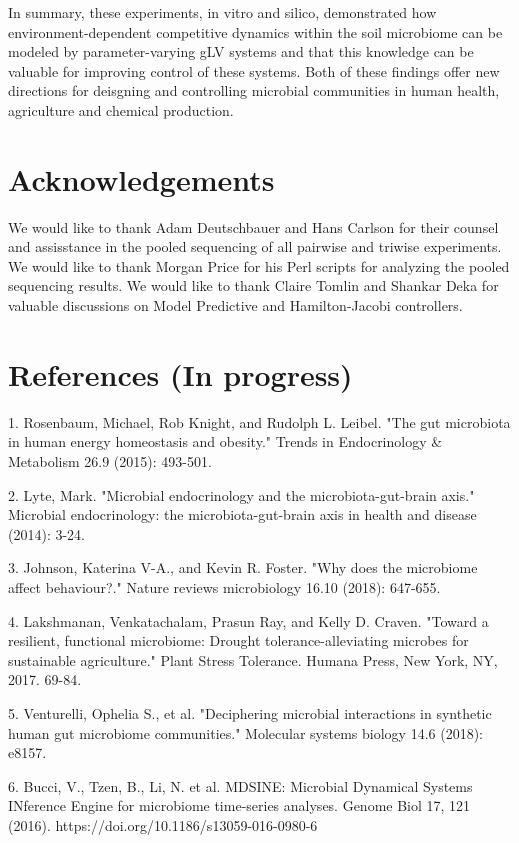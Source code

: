 \documentclass[twocolumn, 10pt]{report}
\begin{document}
{In summary, these experiments, in vitro and silico, demonstrated how environment-dependent competitive dynamics within the soil microbiome can be modeled by parameter-varying gLV systems and that this knowledge can be valuable for improving control of these systems. Both of these findings offer new directions for deisgning and controlling microbial communities in human health, agriculture and chemical production.

\section*{Acknowledgements}

We would like to thank Adam Deutschbauer and Hans Carlson for their counsel and assisstance in the pooled sequencing of all pairwise and triwise experiments. We would like to thank Morgan Price for his Perl scripts for analyzing the pooled sequencing results. We would like to thank Claire Tomlin and Shankar Deka for valuable discussions on Model Predictive and Hamilton-Jacobi controllers.

\section*{References (In progress)}

1. Rosenbaum, Michael, Rob Knight, and Rudolph L. Leibel. "The gut microbiota in human energy homeostasis and obesity." Trends in Endocrinology \& Metabolism 26.9 (2015): 493-501.

2. Lyte, Mark. "Microbial endocrinology and the microbiota-gut-brain axis." Microbial endocrinology: the microbiota-gut-brain axis in health and disease (2014): 3-24.

3. Johnson, Katerina V-A., and Kevin R. Foster. "Why does the microbiome affect behaviour?." Nature reviews microbiology 16.10 (2018): 647-655.

4. Lakshmanan, Venkatachalam, Prasun Ray, and Kelly D. Craven. "Toward a resilient, functional microbiome: Drought tolerance-alleviating microbes for sustainable agriculture." Plant Stress Tolerance. Humana Press, New York, NY, 2017. 69-84.

5. Venturelli, Ophelia S., et al. "Deciphering microbial interactions in synthetic human gut microbiome communities." Molecular systems biology 14.6 (2018): e8157.

6. Bucci, V., Tzen, B., Li, N. et al. MDSINE: Microbial Dynamical Systems INference Engine for microbiome time-series analyses. Genome Biol 17, 121 (2016). https://doi.org/10.1186/s13059-016-0980-6

}
\end{document}
